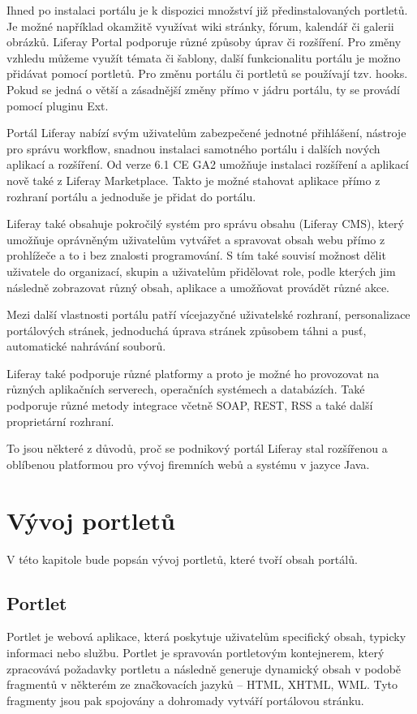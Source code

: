 \documentclass{fithesis}
\begin{document}
Ihned po instalaci portálu je k dispozici množství již předinstalovaných portletů. Je možné například okamžitě využívat wiki stránky, fórum, kalendář či galerii obrázků. Liferay Portal podporuje různé způsoby úprav či rozšíření. Pro změny vzhledu můžeme využít témata či šablony, další funkcionalitu portálu je možno přidávat pomocí portletů. Pro změnu portálu či portletů se používají tzv. hooks. Pokud se jedná o větší a zásadnější změny přímo v jádru portálu, ty se provádí pomocí pluginu Ext. \cite{developer-guide}

Portál Liferay nabízí svým uživatelům zabezpečené jednotné přihlášení, nástroje pro správu workflow, snadnou instalaci samotného portálu i dalších nových aplikací a rozšíření. Od verze 6.1 CE GA2 umožňuje instalaci rozšíření a aplikací nově také z Liferay Marketplace. Takto je možné stahovat aplikace přímo z rozhraní portálu a jednoduše je přidat do portálu.

Liferay také obsahuje pokročilý systém pro správu obsahu (Liferay CMS), který umožňuje oprávněným uživatelům vytvářet a spravovat obsah webu přímo z prohlížeče a to i bez znalosti programování. S tím také souvisí možnost dělit uživatele do organizací, skupin a uživatelům přidělovat role, podle kterých jim následně zobrazovat různý obsah, aplikace a umožňovat provádět různé akce.

Mezi další vlastnosti portálu patří vícejazyčné uživatelské rozhraní, personalizace portálových stránek, jednoduchá úprava stránek způsobem táhni a pusť, automatické nahrávání souborů.

Liferay také podporuje různé platformy a proto je možné ho provozovat na různých aplikačních serverech, operačních systémech a databázích. Také podporuje různé metody integrace včetně SOAP, REST, RSS a také další proprietární rozhraní.\cite{liferay-features}

To jsou některé z důvodů, proč se podnikový portál Liferay stal rozšířenou a oblíbenou platformou pro vývoj firemních webů a systému v jazyce Java.


\chapter{Vývoj portletů}
V této kapitole bude popsán vývoj portletů, které tvoří obsah portálů.

\section{Portlet}
Portlet je webová aplikace, která poskytuje uživatelům specifický obsah, typicky informaci nebo službu. Portlet je spravován portletovým kontejnerem, který zpracovává požadavky portletu a následně generuje dynamický obsah v podobě fragmentů v některém ze značkovacích jazyků -- HTML, XHTML, WML. Tyto fragmenty jsou pak spojovány a dohromady vytváří portálovou stránku.
\end{document}
